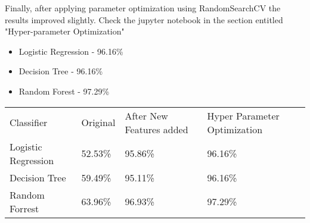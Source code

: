 Finally, after applying parameter optimization using RandomSearchCV the results improved slightly. Check the jupyter notebook in the section entitled "Hyper-parameter Optimization"

\begin{itemize}
  \item Logistic Regression - 96.16\%
  \item Decision Tree - 96.16\%
  \item Random Forest - 97.29\%
\end{itemize}

\begin{table}[H]
\centering
\begin{tabular}{llll}
\rowcolor[HTML]{9B9B9B} 
Classifier                                  & Original & After New Features added & Hyper Parameter Optimization \\
\cellcolor[HTML]{C0C0C0}Logistic Regression & 52.53\%  & 95.86\%                  & 96.16\%                      \\
\cellcolor[HTML]{C0C0C0}Decision Tree       & 59.49\%  & 95.11\%                  & 96.16\%                      \\
\cellcolor[HTML]{C0C0C0}Random Forrest      & 63.96\%  & 96.93\%                  & 97.29\%                     
\end{tabular}
\end{table}